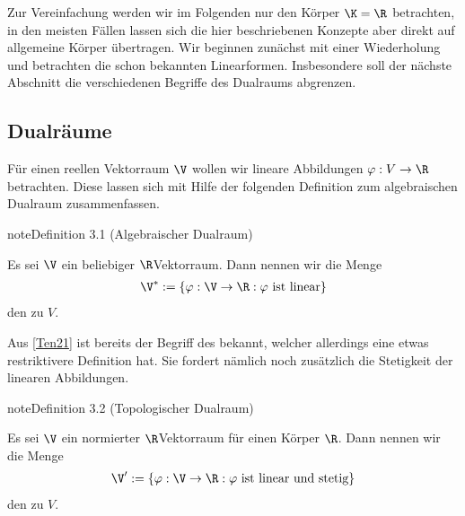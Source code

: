 \documentclass[letterpaper,10pt,english]{jupyterBook}
\begin{document}
\sphinxAtStartPar
Zur Vereinfachung werden wir im Folgenden nur den Körper \(\K=\R\) betrachten, in den meisten Fällen lassen sich die hier beschriebenen Konzepte aber direkt auf allgemeine Körper übertragen.
Wir beginnen zunächst mit einer Wiederholung und betrachten die schon bekannten Linearformen.
Insbesondere soll der nächste Abschnitt die verschiedenen Begriffe des Dualraums abgrenzen.


\subsection{Dualräume}
\label{\detokenize{vektoranalysis/multilinear:dualraume}}
\sphinxAtStartPar
Für einen reellen Vektorraum \(\V\) wollen wir lineare Abbildungen \(\varphi:V\to\R\) betrachten.
Diese lassen sich mit Hilfe der folgenden Definition zum algebraischen Dualraum zusammenfassen.
\label{vektoranalysis/multilinear:def:algebraischerDualraum}
\begin{sphinxadmonition}{note}{Definition 3.1 (Algebraischer Dualraum)}



\sphinxAtStartPar
Es sei \(\V\) ein beliebiger \(\R\)\sphinxhyphen{}Vektorraum.
Dann nennen wir die Menge
\begin{equation*}
\begin{split}\V^\ast := \{\varphi:\V\rightarrow\R: \varphi\text{ ist linear}\}\end{split}
\end{equation*}
\sphinxAtStartPar
den  zu \(V\).
\end{sphinxadmonition}

\sphinxAtStartPar
Aus {[}\hyperlink{cite.references:id12}{Ten21}{]} ist bereits der Begriff des  bekannt, welcher allerdings eine etwas restriktivere Definition hat.
Sie fordert nämlich noch zusätzlich die Stetigkeit der linearen Abbildungen.
\label{vektoranalysis/multilinear:def:topologischerDualraum}
\begin{sphinxadmonition}{note}{Definition 3.2 (Topologischer Dualraum)}



\sphinxAtStartPar
Es sei \(\V\) ein normierter \(\R\)\sphinxhyphen{}Vektorraum für einen Körper \(\R\).
Dann nennen wir die Menge
\begin{equation*}
\begin{split}\V^\prime := \{\varphi:\V\rightarrow\R: \varphi\text{ ist linear und stetig}\}\end{split}
\end{equation*}
\sphinxAtStartPar
den  zu \(V\).
\end{sphinxadmonition}
\end{document}
